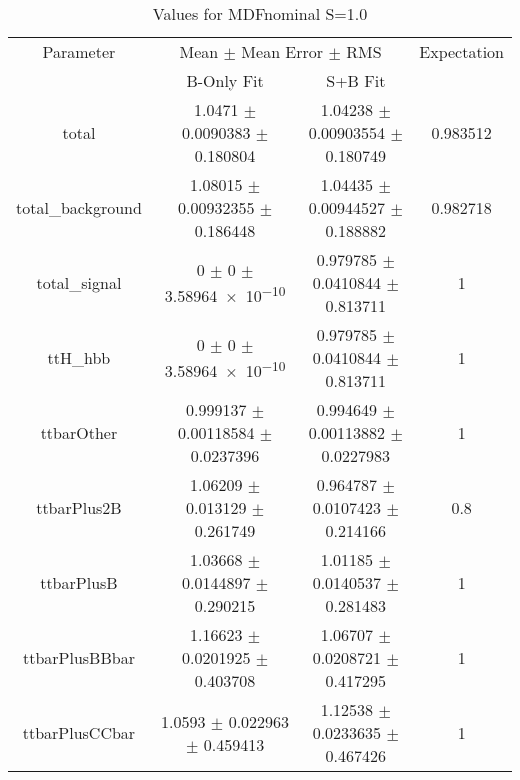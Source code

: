\begin{table}
\centering
\caption{Values for MDFnominal S=1.0}
\begin{tabular}{cccc}
\toprule
Parameter & \multicolumn{2}{c}{Mean $\pm$ Mean Error $\pm$ RMS} & Expectation\\
 & B-Only Fit & S+B Fit & \\
\midrule
total & \num{1.0471} $\pm$ \num{0.0090383} $\pm$ \num{0.180804} & \num{1.04238} $\pm$ \num{0.00903554} $\pm$ \num{0.180749} & \num{0.983512}\\
total\_background & \num{1.08015} $\pm$ \num{0.00932355} $\pm$ \num{0.186448} & \num{1.04435} $\pm$ \num{0.00944527} $\pm$ \num{0.188882} & \num{0.982718}\\
total\_signal & \num{0} $\pm$ \num{0} $\pm$ \num{3.58964e-10} & \num{0.979785} $\pm$ \num{0.0410844} $\pm$ \num{0.813711} & \num{1}\\
ttH\_hbb & \num{0} $\pm$ \num{0} $\pm$ \num{3.58964e-10} & \num{0.979785} $\pm$ \num{0.0410844} $\pm$ \num{0.813711} & \num{1}\\
ttbarOther & \num{0.999137} $\pm$ \num{0.00118584} $\pm$ \num{0.0237396} & \num{0.994649} $\pm$ \num{0.00113882} $\pm$ \num{0.0227983} & \num{1}\\
ttbarPlus2B & \num{1.06209} $\pm$ \num{0.013129} $\pm$ \num{0.261749} & \num{0.964787} $\pm$ \num{0.0107423} $\pm$ \num{0.214166} & \num{0.8}\\
ttbarPlusB & \num{1.03668} $\pm$ \num{0.0144897} $\pm$ \num{0.290215} & \num{1.01185} $\pm$ \num{0.0140537} $\pm$ \num{0.281483} & \num{1}\\
ttbarPlusBBbar & \num{1.16623} $\pm$ \num{0.0201925} $\pm$ \num{0.403708} & \num{1.06707} $\pm$ \num{0.0208721} $\pm$ \num{0.417295} & \num{1}\\
ttbarPlusCCbar & \num{1.0593} $\pm$ \num{0.022963} $\pm$ \num{0.459413} & \num{1.12538} $\pm$ \num{0.0233635} $\pm$ \num{0.467426} & \num{1}\\
\bottomrule
\end{tabular}
\end{table}